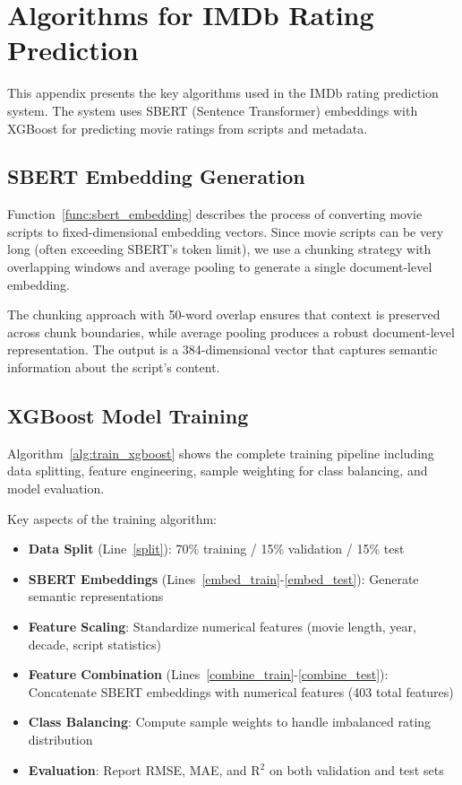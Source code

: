 \chapter{Algorithms for IMDb Rating Prediction}

This appendix presents the key algorithms used in the IMDb rating prediction system. The system uses SBERT (Sentence Transformer) embeddings with XGBoost for predicting movie ratings from scripts and metadata.

\section{SBERT Embedding Generation}

Function~\ref{func:sbert_embedding} describes the process of converting movie scripts to fixed-dimensional embedding vectors. Since movie scripts can be very long (often exceeding SBERT's token limit), we use a chunking strategy with overlapping windows and average pooling to generate a single document-level embedding.

\clearpage


The chunking approach with 50-word overlap ensures that context is preserved across chunk boundaries, while average pooling produces a robust document-level representation. The output is a 384-dimensional vector that captures semantic information about the script's content.

\section{XGBoost Model Training}

Algorithm~\ref{alg:train_xgboost} shows the complete training pipeline including data splitting, feature engineering, sample weighting for class balancing, and model evaluation.

\clearpage


Key aspects of the training algorithm:

\begin{itemize}
    \item \textbf{Data Split} (Line~\ref{split}): 70\% training / 15\% validation / 15\% test
    \item \textbf{SBERT Embeddings} (Lines~\ref{embed_train}-\ref{embed_test}): Generate semantic representations
    \item \textbf{Feature Scaling}: Standardize numerical features (movie length, year, decade, script statistics)
    \item \textbf{Feature Combination} (Lines~\ref{combine_train}-\ref{combine_test}): Concatenate SBERT embeddings with numerical features (403 total features)
    \item \textbf{Class Balancing}: Compute sample weights to handle imbalanced rating distribution
    \item \textbf{Evaluation}: Report RMSE, MAE, and R$^2$ on both validation and test sets
\end{itemize}

